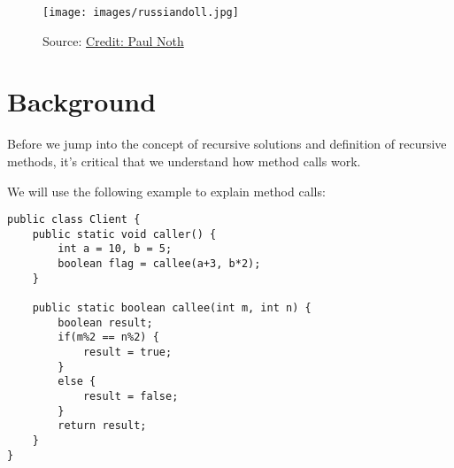 \def\topic{Recursion}


\begin{figure}
\centering	
\texttt{[image: images/russiandoll.jpg]}
\caption{Source: \href{https://condenaststore.com/featured/a-doctor-is-seen-giving-an-sonogram-to-a-russian-paul-noth.html}{Credit: Paul Noth}}
\end{figure}

\section{Background}

Before we jump into the concept of recursive solutions and definition of recursive methods, it's critical that we understand how method calls work.

We will use the following example to explain method calls:

\begin{lstlisting}
public class Client {
	public static void caller() {
		int a = 10, b = 5;
		boolean flag = callee(a+3, b*2);
	}
	
	public static boolean callee(int m, int n) {
		boolean result;
		if(m%2 == n%2) {
			result = true;
		}
		else {
			result = false;
		}
		return result;
	}
}
\end{lstlisting}

